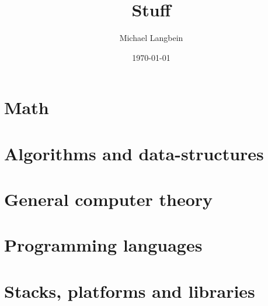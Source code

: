 \documentclass{book}
\title{Stuff}
\author{Michael Langbein}
\date{\today}
\begin{document}
\maketitle
\tableofcontents

\chapter{Math}









%






%



\chapter{Algorithms and data-structures}



\chapter{General computer theory}








\chapter{Programming languages}




%






\chapter{Stacks, platforms and libraries}








\end{document}
